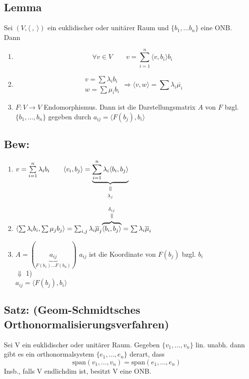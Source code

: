 \documentclass[titlepage,12pt,a4paper,ngerman]{report}
\newcommand{\verteq}{\rotatebox{90}{$\,=$}}
\newcommand{\equalto}[2]{\underset{\scriptstyle\overset{\mkern4mu\verteq}{#2}}{#1}}
\newcommand{\equaltoup}[2]{\overset{\scriptstyle\underset{\mkern4mu\verteq}{#2}}{#1}}
\newcommand{\tx}[1]{\textrm{#1}}
\newcommand{\ub}[1]{\underbrace{#1}}
\newcommand{\spa}{\tx{span}}
\newcommand{\summ}[2]{\sum_{#1}^{#2}}
\begin{document}
\subsection{Lemma} Sei $(V, \langle\ ,\ \rangle)$ ein euklidischer oder unitärer Raum und $\{b_1, \dots b_n \}$ eine ONB. Dann
\begin{enumerate}
	\item $$\forall v \in V \qquad v = \summ{i=1}{n} \langle v,b_i \rangle b_i$$
	\item $$\begin{array}{c} v = \sum \lambda_i b_i \\ w = \sum \mu_i b_i \end{array} \Rightarrow \langle v,w \rangle = \sum \lambda_i \overline{\mu_i}$$
	\item $ F: V \to V $ Endomorphismus. Dann ist die Darstellungsmatrix $ A $ von $ F $ bzgl. $ \{b_1, \dots , b_n\} $ gegeben durch $ a_{ij} = \langle F(b_j),b_i \rangle $
\end{enumerate}

\subsection{Bew:}
\begin{enumerate}[1)]
	\item $ v = \sum\limits_{i=1}^{n} \lambda_i b_i \qquad \langle v_i,b_j \rangle = \equalto{\ub{\sum\limits_{i=1}^{n} \lambda_i \langle b_i, b_j \rangle }}{\lambda_j} $
	\item $ \langle \sum \lambda_i b_i, \sum \mu_j b_j \rangle = \sum_{i,j} \lambda_i \overline{\mu}_j \equaltoup{\overbrace{\langle b_i,b_j \rangle}}{\delta_{ij}} = \sum \lambda_i \overline{\mu}_i $
	\item  $ A = (\ub{a_{ij}}_{F(b_1) \dots F(b_n)}) $ $ a_{ij} $ ist die Koordinate von $ F(b_j) $ bzgl. $ b_i $\\
	$ \Downarrow $ 1)\\
	$ a_{ij} = \langle F(b_j),b_i \rangle $
\end{enumerate}
\subsection{Satz: (Geom-Schmidtsches\\ Orthonormalisierungsverfahren)}
Sei V ein euklidischer oder unitärer Raum. Gegeben $ \{v_1,\dots , v_n \} $ lin. unabh. dann gibt es ein orthonormalsystem $ \{e_1,\dots , e_n \} $ derart, dass
$$\spa(v_1,\dots,v_n) = \spa(e_1,\dots,e_n)$$
Insb., falls V endlichdim ist, besitzt V eine ONB.
\end{document}
